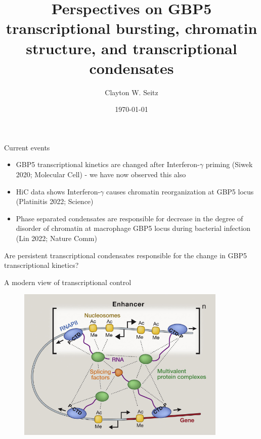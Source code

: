 \documentclass[aspectratio=1610]{beamer}					%
\title{Perspectives on GBP5 transcriptional bursting, chromatin structure, and transcriptional condensates}	%
\author{Clayton W. Seitz}								%
\date{\today}									%
\begin{document}
\begin{frame}
  \titlepage
\end{frame}


%

\begin{frame}{Current events}
\begin{itemize}
\item GBP5 transcriptional kinetics are changed after Interferon-$\gamma$ priming (Siwek 2020; Molecular Cell) - we have now observed this also
\item HiC data shows Interferon-$\gamma$ causes chromatin reorganization at GBP5 locus (Platinitis 2022; Science)
\item Phase separated condensates are responsible for decrease in the degree of disorder of chromatin at macrophage GBP5 locus during bacterial infection (Lin 2022; Nature Comm)
\end{itemize}
\vspace{0.2in}
Are persistent transcriptional condensates responsible for the change in GBP5 transcriptional kinetics?

\end{frame}

\begin{frame}{A modern view of transcriptional control}
\begin{figure}
\includegraphics[width=10cm]{figure-5-6.png}
\end{figure}
\end{frame}
\end{document}
